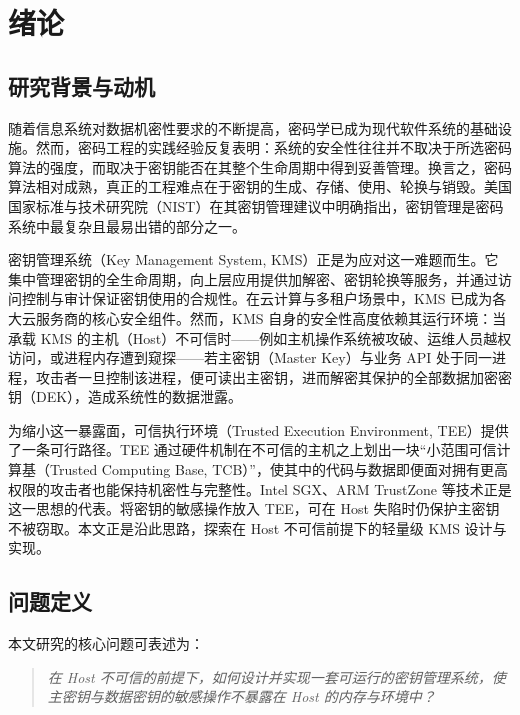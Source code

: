 \chapter{绪论}
\label{ch:intro}

\section{研究背景与动机}

随着信息系统对数据机密性要求的不断提高，密码学已成为现代软件系统的基础设施。然而，密码工程的实践经验反复表明：系统的安全性往往并不取决于所选密码算法的强度，而取决于密钥能否在其整个生命周期中得到妥善管理。换言之，密码算法相对成熟，真正的工程难点在于密钥的生成、存储、使用、轮换与销毁。美国国家标准与技术研究院（NIST）在其密钥管理建议中明确指出，密钥管理是密码系统中最复杂且最易出错的部分之一\cite{nist80057}。

密钥管理系统（Key Management System, KMS）正是为应对这一难题而生。它集中管理密钥的全生命周期，向上层应用提供加解密、密钥轮换等服务，并通过访问控制与审计保证密钥使用的合规性。在云计算与多租户场景中，KMS 已成为各大云服务商的核心安全组件。然而，KMS 自身的安全性高度依赖其运行环境：当承载 KMS 的主机（Host）不可信时——例如主机操作系统被攻破、运维人员越权访问，或进程内存遭到窥探——若主密钥（Master Key）与业务 API 处于同一进程，攻击者一旦控制该进程，便可读出主密钥，进而解密其保护的全部数据加密密钥（DEK），造成系统性的数据泄露。

为缩小这一暴露面，可信执行环境（Trusted Execution Environment, TEE）提供了一条可行路径。TEE 通过硬件机制在不可信的主机之上划出一块“小范围可信计算基（Trusted Computing Base, TCB）”，使其中的代码与数据即便面对拥有更高权限的攻击者也能保持机密性与完整性\cite{sabt2015tee}。Intel SGX、ARM TrustZone 等技术正是这一思想的代表\cite{costan2016sgx, pinto2019trustzone}。将密钥的敏感操作放入 TEE，可在 Host 失陷时仍保护主密钥不被窃取。本文正是沿此思路，探索在 Host 不可信前提下的轻量级 KMS 设计与实现。

\section{问题定义}

本文研究的核心问题可表述为：

\begin{quote}
\itshape 在 Host 不可信的前提下，如何设计并实现一套可运行的密钥管理系统，使主密钥与数据密钥的敏感操作不暴露在 Host 的内存与环境中？
\end{quote}

